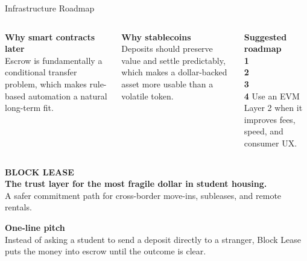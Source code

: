 \documentclass[10pt,aspectratio=169]{beamer}
\newcommand{\infocard}[2]{%
\begin{tcolorbox}[pitchcard]
{\normalsize\bfseries #1}\\[0.8mm]
{\footnotesize\color{muted} #2}
\end{tcolorbox}
}
\begin{document}
\begin{frame}[shrink=8]{Infrastructure Roadmap}
\begin{columns}[T,totalwidth=\textwidth]
\infocard{Why smart contracts later}{Escrow is fundamentally a conditional transfer problem, which makes rule-based automation a natural long-term fit.}
\vspace{1.8mm}
\infocard{Why stablecoins}{Deposits should preserve value and settle predictably, which makes a dollar-backed asset more usable than a volatile token.}

\begin{tcolorbox}[pitchcard,left=4mm,right=4mm,top=4mm,bottom=4mm]
{\Large\bfseries Suggested roadmap}\\[4mm]
\textcolor{accent}{\bfseries 1}\hspace{2mm}{\small Launch the escrow workflow and prove the user story.}\\[2mm]
\textcolor{accent}{\bfseries 2}\hspace{2mm}{\small Standardize agreement states, release rules, and review operations.}\\[2mm]
\textcolor{accent}{\bfseries 3}\hspace{2mm}{\small Add stablecoin settlement on an EVM Layer 2 such as Base.}\\[2mm]
\textcolor{accent}{\bfseries 4}\hspace{2mm}{\small Expand into dispute automation, partner tooling, and policy controls.}
\vspace{2mm}
{\footnotesize\color{muted} Use an EVM Layer 2 when it improves fees, speed, and consumer UX.}
\end{tcolorbox}
\end{columns}
\end{frame}

\begin{frame}[plain]
\begin{center}
\begin{tcolorbox}[darkcard,width=0.92\linewidth,left=7mm,right=7mm,top=6mm,bottom=6mm]
\centering
{\footnotesize\bfseries\textcolor{white!68}{BLOCK LEASE}}\\[4mm]
{\fontsize{22}{25}\selectfont\bfseries\color{white} The trust layer for the most fragile dollar in student housing.}\\[3mm]
{\normalsize\color{white!80} A safer commitment path for cross-border move-ins, subleases, and remote rentals.}\\[6mm]

\begin{tcolorbox}[enhanced,boxrule=0pt,colback=white,arc=7mm,left=8mm,right=8mm,top=5mm,bottom=5mm,width=0.78\linewidth]
\centering
{\Large\bfseries One-line pitch}\\[2.5mm]
{\normalsize Instead of asking a student to send a deposit directly to a stranger, Block Lease puts the money into escrow until the outcome is clear.}
\end{tcolorbox}

\end{tcolorbox}
\end{center}
\end{frame}
\end{document}

